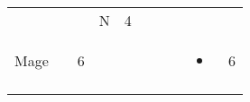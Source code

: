 \documentclass[12pt]{article}
\newcommand{\indexClass}[1]{\index{#1}}
\newcommand{\class}[1]{#1\indexClass{#1}}
\begin{document}
\begin{longtable}[]{@{}llllllllll@{}}
\begin{minipage}[t]{0.06\columnwidth}\raggedright\strut
\strut\end{minipage} &
\begin{minipage}[t]{0.06\columnwidth}\raggedright\strut
\strut\end{minipage} &
\begin{minipage}[t]{0.06\columnwidth}\raggedright\strut
\strut\end{minipage} &
\begin{minipage}[t]{0.07\columnwidth}\raggedright\strut
N
\strut\end{minipage} &
\begin{minipage}[t]{0.08\columnwidth}\raggedright\strut
4
\strut\end{minipage}\tabularnewline
\begin{minipage}[t]{0.13\columnwidth}\raggedright\strut
\class{Mage}
\strut\end{minipage} &
\begin{minipage}[t]{0.06\columnwidth}\raggedright\strut
\strut\end{minipage} &
\begin{minipage}[t]{0.06\columnwidth}\raggedright\strut
6
\strut\end{minipage} &
\begin{minipage}[t]{0.06\columnwidth}\raggedright\strut
\strut\end{minipage} &
\begin{minipage}[t]{0.06\columnwidth}\raggedright\strut
\strut\end{minipage} &
\begin{minipage}[t]{0.06\columnwidth}\raggedright\strut
\strut\end{minipage} &
\begin{minipage}[t]{0.06\columnwidth}\raggedright\strut
\strut\end{minipage} &
\begin{minipage}[t]{0.06\columnwidth}\raggedright\strut
\strut\end{minipage} &
\begin{minipage}[t]{0.07\columnwidth}\raggedright\strut
\begin{itemize}
\item
\end{itemize}
\strut\end{minipage} &
\begin{minipage}[t]{0.08\columnwidth}\raggedright\strut
6
\strut\end{minipage}\tabularnewline
\begin{minipage}[t]{0.13\columnwidth}\raggedright\strut

\end{minipage}
\end{longtable}
\end{document}
